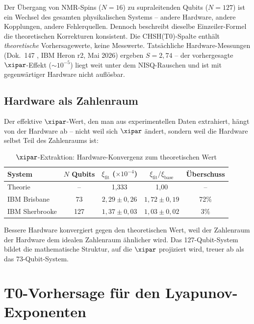 \begin{keyresult}
	Der Übergang von NMR-Spins ($N=16$) zu supraleitenden Qubits ($N=127$) ist ein Wechsel des gesamten physikalischen Systems -- andere Hardware, andere Kopplungen, andere Fehlerquellen. Dennoch beschreibt dieselbe Einzeiler-Formel die theoretischen Korrekturen konsistent. Die CHSH(T0)-Spalte enthält \emph{theoretische} Vorhersagewerte, keine Messwerte. Tatsächliche Hardware-Messungen (Dok.~147 \cite{pascher_quantum_computing_2025}, IBM Heron r2, Mai 2026) ergeben $S = 2{,}74$ -- der vorhergesagte $\xipar$-Effekt ($\sim 10^{-5}$) liegt weit unter dem NISQ-Rauschen und ist mit gegenwärtiger Hardware nicht auflösbar.
\end{keyresult}

\subsection{Hardware als Zahlenraum}

Der effektive $\xipar$-Wert, den man aus experimentellen Daten extrahiert, hängt von der Hardware ab -- nicht weil sich $\xipar$ ändert, sondern weil die Hardware selbst Teil des Zahlenraums ist:

\begin{table}[h]
	\centering
	\caption{$\xipar$-Extraktion: Hardware-Konvergenz zum theoretischen Wert}
	\label{tab:xi_convergence}
	\begin{tabular}{@{}lcccc@{}}
		\toprule
		System & $N$ Qubits & $\xi_{\text{fit}}$ ($\times 10^{-4}$) & $\xi_{\text{fit}}/\xi_{\text{base}}$ & Überschuss \\
		\midrule
		Theorie & -- & 1,333 & 1,00 & -- \\
		IBM Brisbane & 73 & $2{,}29 \pm 0{,}26$ & $1{,}72 \pm 0{,}19$ & 72\% \\
		IBM Sherbrooke & 127 & $1{,}37 \pm 0{,}03$ & $1{,}03 \pm 0{,}02$ & 3\% \\
		\bottomrule
	\end{tabular}
\end{table}

Bessere Hardware konvergiert gegen den theoretischen Wert, weil der Zahlenraum der Hardware dem idealen Zahlenraum ähnlicher wird. Das 127-Qubit-System bildet die mathematische Struktur, auf die $\xipar$ projiziert wird, treuer ab als das 73-Qubit-System.


\section{T0-Vorhersage für den Lyapunov-Exponenten}
\label{sec:lyapunov}

